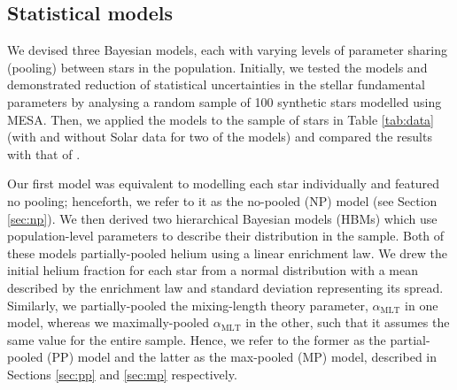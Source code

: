 \documentclass[a4paper,fleqn,usenatbib]{mnras}
\newcommand{\mlt}{\ensuremath{{\alpha_\mathrm{MLT}}}}
\begin{document}

\subsection{Statistical models}\label{sec:hbm}

We devised three Bayesian models, each with varying levels of parameter sharing (pooling) between stars in the population. Initially, we tested the models and demonstrated reduction of statistical uncertainties in the stellar fundamental parameters by analysing a random sample of 100 synthetic stars modelled using MESA. Then, we applied the models to the sample of stars in Table \ref{tab:data} (with and without Solar data for two of the models) and compared the results with that of .

Our first model was equivalent to modelling each star individually and featured no pooling; henceforth, we refer to it as the no-pooled (NP) model (see Section \ref{sec:np}). We then derived two hierarchical Bayesian models (HBMs) which use population-level parameters to describe their distribution in the sample. Both of these models partially-pooled helium using a linear enrichment law. We drew the initial helium fraction for each star from a normal distribution with a mean described by the enrichment law and standard deviation representing its spread. Similarly, we partially-pooled the mixing-length theory parameter, $\mlt$ in one model, whereas we maximally-pooled $\mlt$ in the other, such that it assumes the same value for the entire sample. Hence, we refer to the former as the partial-pooled (PP) model and the latter as the max-pooled (MP) model, described in Sections \ref{sec:pp} and \ref{sec:mp} respectively.
\end{document}

